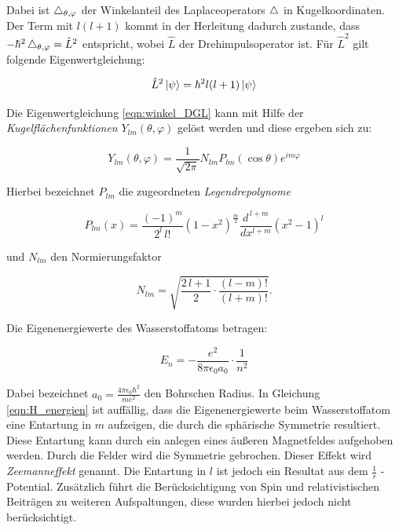 Dabei ist $\mathop{}\!\mathbin\bigtriangleup_{\theta, \varphi}$ der Winkelanteil des Laplaceoperators $\mathop{}\!\mathbin\bigtriangleup$ in Kugelkoordinaten. Der Term mit $l (l+1)$ kommt in der Herleitung dadurch zustande, dass $- \hbar^2 \mathop{}\!\mathbin\bigtriangleup_{\theta, \varphi} = \hat{L}^2$ entspricht, wobei $\hat{L}$ der Drehimpulsoperator ist. Für $\hat{L}^2$ gilt folgende Eigenwertgleichung:

\begin{equation}
    \hat{L}^2 \ket{\psi} = \hbar^2 l(l+1) \ket{\psi}
    \label{eqn:L}
\end{equation}

Die Eigenwertgleichung \eqref{eqn:winkel_DGL} kann mit Hilfe der \textit{Kugelflächenfunktionen} $Y_{lm} (\theta, \varphi)$ gelöst werden und diese ergeben sich zu:

\begin{equation}
    Y_{lm} (\theta, \varphi) = \frac{1}{\sqrt{2 \pi}} N_{lm} P_{lm} (\cos \theta) e^{im \varphi}
    \label{eqn:kugelflaechen}
\end{equation}

Hierbei bezeichnet $P_{lm}$ die zugeordneten \textit{Legendrepolynome}

\begin{equation}
    P_{lm} (x) = \frac{(-1)^m}{2^l \, l!} \left( 1-x^2 \right)^{\! \frac{m}{2}} \frac{d^{\, l+m}}{dx^{l+m}} \left( x^2 - 1 \right)^l
    \label{eqn:legendre}
\end{equation}

und $N_{lm}$ den Normierungsfaktor

\begin{equation}
    N_{lm} = \sqrt{\frac{2 \, l +1}{2} \cdot \frac{(l-m)!}{(l+m)!}} .
    \label{eqn:normierung}
\end{equation}

Die Eigenenergiewerte des Wasserstoffatoms betragen:

\begin{equation}
    E_n = - \frac{e^2}{8 \pi \epsilon_0 a_0} \cdot \frac{1}{n^2}
    \label{eqn:H_energien}
\end{equation}

Dabei bezeichnet $a_0 = \frac{4 \pi \epsilon_0 \hbar^2}{m e^2}$ den Bohrschen Radius. In Gleichung \eqref{eqn:H_energien} ist auffällig, dass die Eigenenergiewerte beim Wasserstoffatom eine Entartung in $m$ aufzeigen, die durch die sphärische Symmetrie resultiert. Diese Entartung kann durch ein anlegen eines äußeren Magnetfeldes aufgehoben werden. Durch die Felder wird die Symmetrie gebrochen. Dieser Effekt wird \textit{Zeemanneffekt} genannt. Die Entartung in $l$ ist jedoch ein Resultat aus dem $\frac{1}{r}$ - Potential. Zusätzlich führt die Berücksichtigung von Spin und relativistischen Beiträgen zu weiteren Aufspaltungen, diese wurden hierbei jedoch nicht berücksichtigt.

